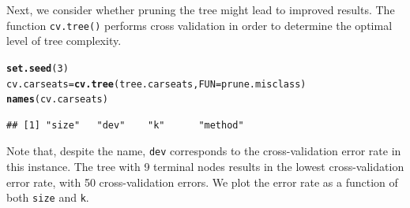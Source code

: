 \documentclass[12pt]{article}\usepackage[]{graphicx}\usepackage[]{color}
\makeatletter
\newcommand{\hlnum}[1]{\textcolor[rgb]{0.686,0.059,0.569}{#1}}%
\newcommand{\hlstd}[1]{\textcolor[rgb]{0.345,0.345,0.345}{#1}}%
\newcommand{\hlkwb}[1]{\textcolor[rgb]{0.69,0.353,0.396}{#1}}%
\newcommand{\hlkwc}[1]{\textcolor[rgb]{0.333,0.667,0.333}{#1}}%
\newcommand{\hlkwd}[1]{\textcolor[rgb]{0.737,0.353,0.396}{\textbf{#1}}}%
\newenvironment{kframe}{%
 \def\at@end@of@kframe{}%
 \ifinner\ifhmode%
  \def\at@end@of@kframe{\end{minipage}}%
  \begin{minipage}{\columnwidth}%
 \fi\fi%
 \def\FrameCommand##1{\hskip\@totalleftmargin \hskip-\fboxsep
 \colorbox{shadecolor}{##1}\hskip-\fboxsep
     \hskip-\linewidth \hskip-\@totalleftmargin \hskip\columnwidth}%
 \MakeFramed {\advance\hsize-\width
   \@totalleftmargin\z@ \linewidth\hsize
   \@setminipage}}%
 {\par\unskip\endMakeFramed%
 \at@end@of@kframe}
\newenvironment{knitrout}{}{} %
\makeatother
\begin{document}
Next, we consider whether pruning the tree might lead to improved results. The function \texttt{cv.tree()} performs cross validation in order to determine the optimal level of tree complexity.

\begin{knitrout}
\color{fgcolor}\begin{kframe}
\begin{alltt}
\hlkwd{set.seed}\hlstd{(}\hlnum{3}\hlstd{)}
\hlstd{cv.carseats}\hlkwb{=}\hlkwd{cv.tree}\hlstd{(tree.carseats,}\hlkwc{FUN}\hlstd{=prune.misclass)}
\hlkwd{names}\hlstd{(cv.carseats)}
\end{alltt}
\begin{verbatim}
## [1] "size"   "dev"    "k"      "method"
\end{verbatim}
\end{kframe}
\end{knitrout}

Note that, despite the name, \texttt{dev} corresponds to the cross-validation error rate in this instance. The tree with 9 terminal nodes results in the lowest cross-validation error rate, with 50 cross-validation errors. We plot the error rate as a function of both \texttt{size} and \texttt{k}.
\end{document}
